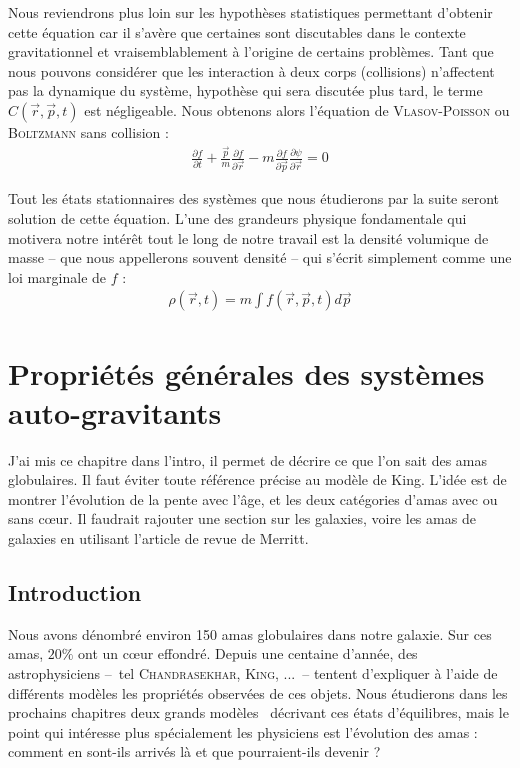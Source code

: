 	Nous reviendrons plus loin sur les hypoth\`{e}ses statistiques permettant d'obtenir cette \'{e}quation car il s'av\`{e}re que certaines sont discutables dans le contexte gravitationnel et vraisemblablement \`{a} l'origine de certains probl\`{e}mes. Tant que nous pouvons consid\'{e}rer que les  interaction \`{a} deux corps (collisions) n'affectent pas la dynamique du syst\`{e}me, hypoth\`{e}se qui sera discut\'{e}e plus tard, le
	terme  $ C(\vec{r},\vec{p}, t) $ est n\'{e}gligeable. Nous obtenons alors l'\'{e}quation de
	\textsc{Vlasov-Poisson} ou \textsc{Boltzmann} sans collision :
	\begin{align}
		\frac{\partial f}{\partial t} +\frac{\vec{p}}{m}\frac{\partial f}{\partial \vec{r}} - m\frac{\partial f}{\partial \vec{p}} \frac{\partial \psi}{\partial \vec{r}} = 0
		\label{Vla-Pois}
	\end{align}

	Tout les \'{e}tats stationnaires des syst\`{e}mes que nous \'{e}tudierons par la suite seront solution de cette \'{e}quation.
	L'une des grandeurs physique fondamentale qui motivera notre int\'{e}r\^{e}t tout le long de notre travail est la densit\'{e} volumique de masse -- que nous appellerons souvent densit\'{e} -- qui s'\'{e}crit simplement comme une loi marginale de $f$ :
	\begin{align}
		\rho(\vec{r},t) = m\int f(\vec{r},\vec{p},t) d\vec{p} \label{def-dens}
	\end{align}

\chapter{Propriétés générales des systèmes auto-gravitants}

J'ai mis ce chapitre dans l'intro, il permet de décrire ce que l'on sait des amas globulaires. Il faut éviter toute référence précise au modèle de King. L'idée est de montrer l'évolution de la pente avec l'âge, et les deux catégories d'amas avec ou sans c\oe ur.
 Il faudrait rajouter une section sur les galaxies, voire les amas de galaxies en utilisant l'article de revue de Merritt.

	\minitoc
	\section{Introduction}

	Nous avons dénombré environ 150 amas globulaires dans notre galaxie. Sur ces amas, $20\%$ ont un cœur effondré. %
	Depuis une centaine d'année, des astrophysiciens --~tel \textsc{Chandrasekhar}, \textsc{King}, ...~--
	tentent d'expliquer à l'aide de différents modèles les propriétés observées de ces objets.
	Nous étudierons dans les prochains chapitres deux \og grands modèles \fg~décrivant ces états d'équilibres,
	mais le point qui intéresse plus spécialement les physiciens est l'évolution des amas : comment en sont-ils
	arrivés là et que pourraient-ils devenir ?

